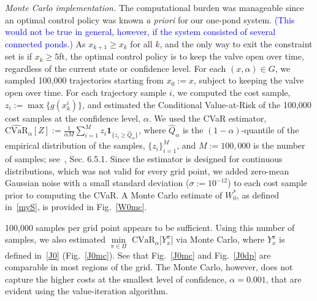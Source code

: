 \documentclass[letterpaper, 10 pt, conference]{ieeeconf}  %
\begin{document}
\textit{Monte Carlo implementation.}
The computational burden was manageable since an optimal control policy was known \textit{a priori} for our one-pond system.
\textcolor{blue}{(This would not be true in general, however, if the system consisted of several connected ponds.)} 
As $x_{k+1}\geq x_k$ for all $k$, and the only way to exit the constraint set is if $x_k \geq 5$ft,
the optimal control policy is to keep the valve open over time, regardless of the current state or confidence level.
For each $(x,\alpha) \in G$, we sampled 100,000 trajectories starting from $x_0 := x$, subject to keeping the valve open over time.
For each trajectory sample $i$, we computed the cost sample, $z_i := \max\{g(x_k^i)\}$, and estimated the Conditional Value-at-Risk
of the 100,000 cost samples at the confidence level, $\alpha$. 
We used the CVaR estimator, $\widehat{\text{CVaR}}_\alpha[Z] := \frac{1}{\alpha M}\sum_{i=1}^M z_i \textbf{1}_{\{z_i\geq \hat{Q}_\alpha\}}$,
where $\hat{Q}_\alpha$ is the $(1-\alpha)$-quantile of the empirical distribution of the samples, $\{z_i\}_{i=1}^M$,
and $M := 100,000$ is the number of samples; see~\cite{shapiro2009lectures}, Sec. 6.5.1.
Since the estimator is designed for continuous distributions, which was not valid for every grid point,
we added zero-mean Gaussian noise with a small standard deviation ($\sigma := 10^{-12}$) to each cost sample prior to computing the CVaR.
A Monte Carlo estimate of $W_0^*$, as defined in~\eqref{myS}, is provided in Fig.~\ref{W0mc}.

100,000 samples per grid point appears to be sufficient. 
Using this number of samples, we also estimated ${\underset{\pi \in \Pi}\min} \text{ CVaR}_\alpha \big[ Y_x^\pi \big]$ via Monte Carlo, where
$Y_x^\pi$ is defined in~\eqref{J0} (Fig.~\ref{J0mc}).\footnotemark
{}
See that Fig.~\ref{J0mc} and Fig.~\ref{J0dp} are comparable in most regions of the grid. 
The Monte Carlo, however, does not capture the higher costs at the smallest level of confidence, $\alpha = 0.001$,
that are evident using the value-iteration algorithm.   
\end{document}
